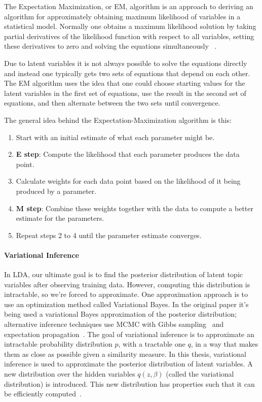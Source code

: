 \documentclass[12pt]{report}
\begin{document}
The Expectation Maximization, or EM, algorithm is an approach to deriving an
algorithm for approximately obtaining maximum likelihood of variables in a
statistical model. Normally one obtains a maximum likelihood solution by taking
partial derivatives of the likelihood function with respect to all variables,
setting these derivatives to zero and solving the equations simultaneously
~\cite{Myung:2003}.

Due to latent variables it is not always possible to solve the equations
directly and instead one typically gets two sets of equations that depend on
each other. The EM algorithm uses the idea that one could choose starting
values for the latent variables in the first set of equations, use the result
in the second set of equations, and then alternate between the two sets until
convergence.

The general idea behind the Expectation-Maximization algorithm is this:

\begin{enumerate}
\item Start with an initial estimate of what each parameter might be.
\item \textbf{E step}: Compute the likelihood that each parameter produces 
the data point.
\item Calculate weights for each data point based on the likelihood of it 
being produced by a parameter.
\item \textbf{M step}: Combine these weights together with the data to 
compute a better estimate for the parameters.
\item Repeat steps 2 to 4 until the parameter estimate converges.
\end{enumerate}

\paragraph{Variational Inference}

In LDA, our ultimate goal is to find the posterior distribution of
latent topic variables after observing training data. However,
computing this distribution is intractable, so we're forced to
approximate. One approximation approach is to use an optimization
method called Variational Bayes. In the original paper it's being used
a variational Bayes approximation of the posterior distribution;
~\cite{blei2003latent} alternative inference techniques use 
MCMC with Gibbs sampling~\cite{Griffiths02gibbssampling} and expectation 
propagation~\cite{Minka:2002:EGA:2073876.2073918}. The goal of variational
inference is to approximate an intractable probability distribution
$p$, with a tractable one $q$, in a way that makes them as close as
possible given a similarity measure. In this thesis, variational
inference is used to approximate the posterior distribution of latent
variables. A new distribution over the hidden variables $q(z, \beta)$
(called the variational distribution) is introduced. This new
distribution has properties such that it can be efficiently
computed~\cite{Fox2011ATO}.
\end{document}
